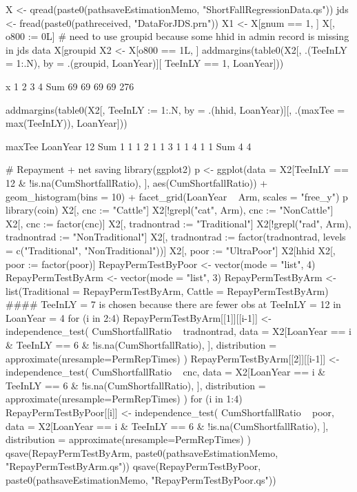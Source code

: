 \begin{Schunk}
\begin{Sinput}
X <- qread(paste0(pathsaveEstimationMemo, "ShortFallRegressionData.qs"))
jds <- fread(paste0(pathreceived, "DataForJDS.prn"))
X1 <- X[gnum == 1, ]
X[, o800 := 0L]
# need to use groupid because some hhid in admin record is missing in jds data
X[groupid %
X2 <- X[o800 == 1L, ]
addmargins(table0(X2[, .(TeeInLY = 1:.N), by = .(groupid, LoanYear)][
  TeeInLY == 1, LoanYear]))
\end{Sinput}
\begin{Soutput}
x
  1   2   3   4 Sum 
 69  69  69  69 276 
\end{Soutput}
\begin{Sinput}
addmargins(table0(X2[, TeeInLY := 1:.N, by = .(hhid, LoanYear)][,
  .(maxTee = max(TeeInLY)), LoanYear]))
\end{Sinput}
\begin{Soutput}
        maxTee
LoanYear 12 Sum
     1    1   1
     2    1   1
     3    1   1
     4    1   1
     Sum  4   4
\end{Soutput}
\begin{Sinput}
# Repayment + net saving
library(ggplot2)
p <- ggplot(data = X2[TeeInLY == 12 & !is.na(CumShortfallRatio), ], aes(CumShortfallRatio)) +
  geom_histogram(bins = 10) + facet_grid(LoanYear ~ Arm, scales = "free_y")
p
library(coin)
X2[, cnc := "Cattle"]
X2[!grepl("cat", Arm), cnc := "NonCattle"]
X2[, cnc := factor(cnc)]
X2[, tradnontrad := "Traditional"]
X2[!grepl("rad", Arm), tradnontrad := "NonTraditional"]
X2[, tradnontrad := factor(tradnontrad, levels = c("Traditional", "NonTraditional"))]
X2[, poor := "UltraPoor"]
X2[hhid %
X2[, poor := factor(poor)]
RepayPermTestByPoor <- vector(mode = "list", 4)
RepayPermTestByArm <- vector(mode = "list", 3)
RepayPermTestByArm <- list(Traditional = RepayPermTestByArm, Cattle = RepayPermTestByArm)
#### TeeInLY = 7 is chosen because there are fewer obs at TeeInLY = 12 in LoanYear = 4
for (i in 2:4) {
  RepayPermTestByArm[[1]][[i-1]] <-  independence_test(
      CumShortfallRatio ~ tradnontrad, 
      data = X2[LoanYear == i & TeeInLY == 6 & !is.na(CumShortfallRatio), ], 
      distribution = approximate(nresample=PermRepTimes)
    )
  RepayPermTestByArm[[2]][[i-1]] <-  independence_test(
      CumShortfallRatio ~ cnc, 
      data = X2[LoanYear == i & TeeInLY == 6 & !is.na(CumShortfallRatio), ], 
      distribution = approximate(nresample=PermRepTimes)
    )
}
for (i in 1:4) 
  RepayPermTestByPoor[[i]] <-  independence_test(
      CumShortfallRatio ~ poor, 
      data = X2[LoanYear == i & TeeInLY == 6 & !is.na(CumShortfallRatio), ], 
      distribution = approximate(nresample=PermRepTimes)
    )
qsave(RepayPermTestByArm, 
  paste0(pathsaveEstimationMemo, "RepayPermTestByArm.qs"))
qsave(RepayPermTestByPoor, 
  paste0(pathsaveEstimationMemo, "RepayPermTestByPoor.qs"))
\end{Sinput}



\end{Schunk}
